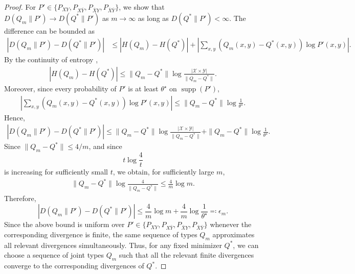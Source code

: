 \documentclass[journal,onecolumn]{IEEEtran}
\theoremstyle{definition}
\theoremstyle{remark}
\newcommand{\Pxy}{P_{XY}}
\newcommand{\Pxby}{P_{X\bar{Y}}}
\newcommand{\Pbxy}{P_{\bar{X}Y}}
\newcommand{\Pbxby}{P_{\bar{X}\bar{Y}}}
\begin{document}
\begin{proof}
    For $P' \in \{\Pxy,\Pxby,\Pbxy,\Pbxby\}$, we show that $D(Q_m\|P')\to D(Q^\ast\|P')$ as $m\to\infty$ as long as $D(Q^\ast\|P')<\infty$.
    The difference can be bounded as
    \begin{align*}
        \left|D(Q_m\|P')-D(Q^\ast\|P')\right|
        &\leq
        \left|H(Q_m)-H(Q^\ast)\right| 
        +
        \left|
            \sum_{x,y}
            \left(Q_m(x,y)-Q^\ast(x,y)\right)
            \log P'(x,y)
        \right|.
    \end{align*}
    By the continuity of entropy \cite[Lemma 2.7]{Csiszár_Körner_2011},
    \begin{align*}
        \left|H(Q_m)-H(Q^\ast)\right|
        \leq
        \|Q_m-Q^\ast\|
        \log
        \frac{|\mathcal{X}\times\mathcal{Y}|}{\|Q_m-Q^\ast\|}.
    \end{align*}
    Moreover, since every probability of $P'$ is at least $\theta^\star$ on $\operatorname{supp}(P')$,
    \begin{align*}
        \left|
            \sum_{x,y}
            \left(Q_m(x,y)-Q^\ast(x,y)\right)
            \log P'(x,y)
        \right|
        \leq
        \|Q_m-Q^\ast\| \log\frac{1}{\theta^\star}.
    \end{align*}
    Hence,
    \begin{align*}
        \left|D(Q_m\|P')-D(Q^\ast\|P')\right|
        \leq
        \|Q_m-Q^\ast\|
        \log
        \frac{|\mathcal{X}\times\mathcal{Y}|}{\|Q_m-Q^\ast\|}
        +
        \|Q_m-Q^\ast\| \log\frac{1}{\theta^\star}.
    \end{align*}
    Since $\|Q_m-Q^\ast\|\leq 4/m$, and since
    \[
        t\log\frac{4}{t}
    \]
    is increasing for sufficiently small $t$, we obtain, for sufficiently large $m$,
    \begin{align*}
        \|Q_m-Q^\ast\|
        \log
        \frac{4}{\|Q_m-Q^\ast\|}
        \leq
        \frac{4}{m}\log m.
    \end{align*}
    Therefore,
    \begin{equation}\label{eq:continuity of divergence}
        \left|D(Q_m\|P')-D(Q^\ast\|P')\right|
        \leq
        \frac{4}{m}\log m
        +
        \frac{4}{m}\log\frac{1}{\theta^\star}
        \eqcolon \epsilon_m.
    \end{equation}
    Since the above bound is uniform over
    \(P'\in\{\Pxy,\Pxby,\Pbxy,\Pbxby\}\)
    whenever the corresponding divergence is finite, the same
    sequence of types \(Q_m\) approximates all relevant divergences
    simultaneously.
    Thus, for any fixed minimizer \(Q^\ast\), we can choose a
    sequence of joint types \(Q_m\) such that all the relevant
    finite divergences converge to the corresponding divergences
    of \(Q^\ast\).


\end{proof}
\end{document}
